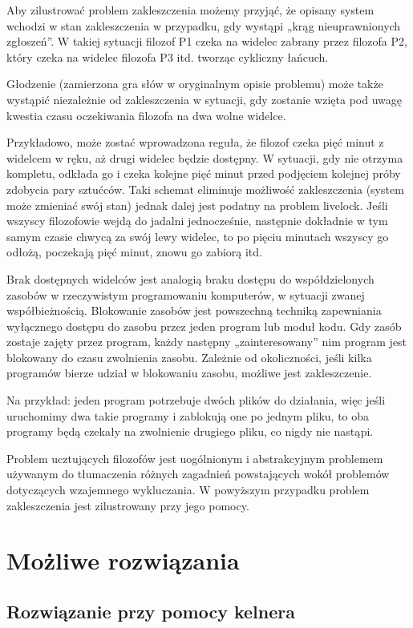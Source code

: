 \documentclass[a4paper, 12pt]{report}
\begin{document}
Aby zilustrować problem zakleszczenia możemy przyjąć, że opisany system wchodzi w stan zakleszczenia w przypadku, gdy wystąpi „krąg nieuprawnionych zgłoszeń”. W takiej sytuacji filozof P1 czeka na widelec zabrany przez filozofa P2, który czeka na widelec filozofa P3 itd. tworząc cykliczny łańcuch.

Głodzenie (zamierzona gra słów w oryginalnym opisie problemu) może także wystąpić niezależnie od zakleszczenia w sytuacji, gdy zostanie wzięta pod uwagę kwestia czasu oczekiwania filozofa na dwa wolne widelce.

Przykładowo, może zostać wprowadzona reguła, że filozof czeka pięć minut z widelcem w ręku, aż drugi widelec będzie dostępny. W sytuacji, gdy nie otrzyma kompletu, odkłada go i czeka kolejne pięć minut przed podjęciem kolejnej próby zdobycia pary sztućców. Taki schemat eliminuje możliwość zakleszczenia (system może zmieniać swój stan) jednak dalej jest podatny na problem livelock. Jeśli wszyscy filozofowie wejdą do jadalni jednocześnie, następnie dokładnie w tym samym czasie chwycą za swój lewy widelec, to po pięciu minutach wszyscy go odłożą, poczekają pięć minut, znowu go zabiorą itd.

Brak dostępnych widelców jest analogią braku dostępu do współdzielonych zasobów w rzeczywistym programowaniu komputerów, w sytuacji zwanej współbieżnością. Blokowanie zasobów jest powszechną techniką zapewniania wyłącznego dostępu do zasobu przez jeden program lub moduł kodu. Gdy zasób zostaje zajęty przez program, każdy następny „zainteresowany” nim program jest blokowany do czasu zwolnienia zasobu. Zależnie od okoliczności, jeśli kilka programów bierze udział w blokowaniu zasobu, możliwe jest zakleszczenie.

Na przykład: jeden program potrzebuje dwóch plików do działania, więc jeśli uruchomimy dwa takie programy i zablokują one po jednym pliku, to oba programy będą czekały na zwolnienie drugiego pliku, co nigdy nie nastąpi.

Problem ucztujących filozofów jest uogólnionym i abstrakcyjnym problemem używanym do tłumaczenia różnych zagadnień powstających wokół problemów dotyczących wzajemnego wykluczania. W powyższym przypadku problem zakleszczenia jest zilustrowany przy jego pomocy.

\chapter{Możliwe rozwiązania}
\section{Rozwiązanie przy pomocy kelnera}
\end{document}
